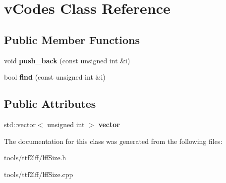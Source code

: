 \hypertarget{classvCodes}{\section{v\-Codes Class Reference}
\label{classvCodes}
}
\subsection*{Public Member Functions}
\begin{DoxyCompactItemize}
\item 
\hypertarget{classvCodes_add8f94b7e0759781b52ed5e02f482fa6}{void {\bfseries push\-\_\-back} (const unsigned int \&i)}\label{classvCodes_add8f94b7e0759781b52ed5e02f482fa6}

\item 
\hypertarget{classvCodes_a3bab23747a6c172b3f23bbe0619cdb17}{bool {\bfseries find} (const unsigned int \&i)}\label{classvCodes_a3bab23747a6c172b3f23bbe0619cdb17}

\end{DoxyCompactItemize}
\subsection*{Public Attributes}
\begin{DoxyCompactItemize}
\item 
\hypertarget{classvCodes_a588169e2305058f827e9cb3b694e2f47}{std\-::vector$<$ unsigned int $>$ {\bfseries vector}}\label{classvCodes_a588169e2305058f827e9cb3b694e2f47}

\end{DoxyCompactItemize}


The documentation for this class was generated from the following files\-:\begin{DoxyCompactItemize}
\item 
tools/ttf2lff/lff\-Size.\-h\item 
tools/ttf2lff/lff\-Size.\-cpp\end{DoxyCompactItemize}
